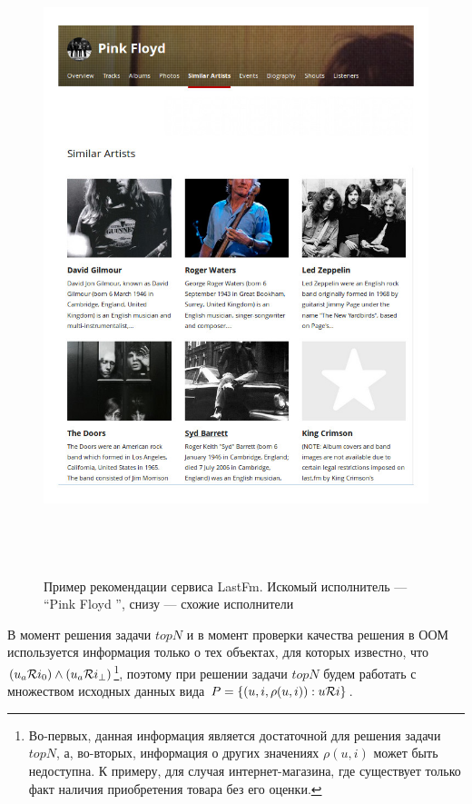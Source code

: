 \begin{figure}[htb]
	\caption{Пример рекомендации сервиса LastFm. Искомый исполнитель ---
\textquotedblleft Pink Floyd \textquotedblright, снизу --- схожие исполнители}
\begin{center}
	\label{amazon-ex1}
 \includegraphics[width=7in,height=7in]{pics/lstfm-rs-example.jpeg}
\end{center}
\end{figure}

В момент решения задачи $topN$ и в момент проверки качества решения
в ООМ используется информация только
о тех объектах, для которых известно, что $(u_a \mathcal{R} i_0) \wedge (u_a \mathcal{R}
i_{\bot})$\footnote{
	Во-первых, данная информация является достаточной для решения задачи
	$topN$, а, во-вторых, информация о других значениях $\rho(u, i)$
	может быть недоступна. К примеру, для случая интернет-магазина, где
	существует только факт наличия приобретения товара без его оценки.
	},
поэтому при решении задачи $topN$ будем работать с множеством исходных
данных вида $P = \{(u, i, \rho(u, i)): u \mathcal{R} i \}$.

